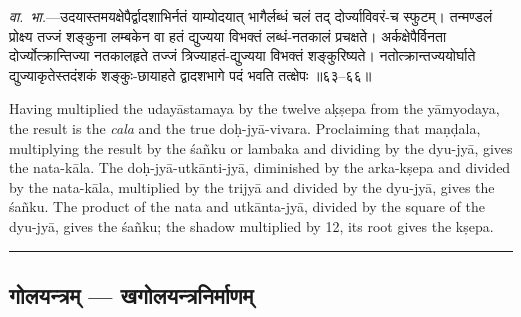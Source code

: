 \documentclass[11pt,a4paper]{article}
\newcommand{\longline}{\noindent\rule{\textwidth}{0.4pt}}
\newcommand{\dev}[1]{{\devanagarifont #1}}
\newcommand{\sectsep}{\par\vspace{0.8em}\longline\vspace{0.8em}}
\begin{document}
\vspace{0.5em}
\begin{minipage}[t]{0.48\textwidth}
\small\devanagarifont
\textit{वा.~भा.}---उदयास्तमयक्षेपैर्द्वादशाभिर्नतं याम्योदयात् भागैर्लब्धं चलं तद् दोर्ज्याविवरं-च स्फुटम्। तन्मण्डलं प्रोक्ष्य तज्जं शङ्कुना लम्बकेन वा हतं द्युज्यया विभक्तं लब्धं-नतकालं प्रचक्षते। अर्कक्षेपैर्विनता दोर्ज्योत्क्रान्तिज्या नतकालहृते तज्जं त्रिज्याहतं-द्युज्यया विभक्तं शङ्कुरिष्यते। नतोत्क्रान्तज्ययोर्घाते द्युज्याकृतेस्तदंशकं शङ्कुः-छायाहते द्वादशभागे पदं भवति तत्क्षेपः ॥६३--६६॥
\end{minipage}%
\hfill
\begin{minipage}[t]{0.48\textwidth}
\small
Having multiplied the uday\=astamaya by the twelve a\d{k}\d{s}epa from the y\=amyodaya, the result is the \textit{cala} and the true do\d{h}-jy\=a-vivara. Proclaiming that ma\d{n}\d{d}ala, multiplying the result by the \'sa\~nku or lambaka and dividing by the dyu-jy\=a, gives the nata-k\=ala. The do\d{h}-jy\=a-utk\=anti-jy\=a, diminished by the arka-k\d{s}epa and divided by the nata-k\=ala, multiplied by the trijy\=a and divided by the dyu-jy\=a, gives the \'sa\~nku. The product of the nata and utk\=anta-jy\=a, divided by the square of the dyu-jy\=a, gives the \'sa\~nku; the shadow multiplied by 12, its root gives the k\d{s}epa.
\end{minipage}

\sectsep

\subsection{\dev{गोलयन्त्रम् --- खगोलयन्त्रनिर्माणम्}}
\end{document}
